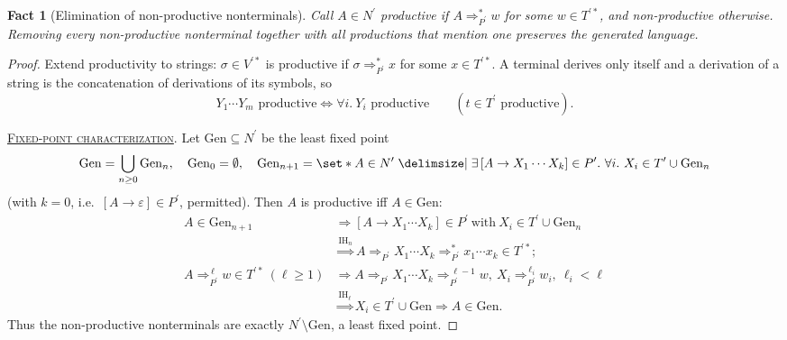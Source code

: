 \documentclass[11pt,a4paper]{article}
\theoremstyle{prettyplain}
\newtheorem{fact}[theorem]{Fact}
\theoremstyle{prettydef}
\def\mid{\;\delimsize\vert\;}#1%
\newcommand{\eps}{\varepsilon}
\newcommand{\Item}[2]{[#1\to #2]}
\newcommand{\proofpart}[1]{\par\medskip\noindent\uline{\textsc{#1}}.}
\begin{document}
\begin{fact}[Elimination of non-productive nonterminals]\label{fact:productive}
Call \(A\in N^\prime\) \emph{productive} if \(A\Rightarrow_{P^\prime}^*w\) for some
\(w\in T^{\prime *}\), and \emph{non-productive} otherwise.  Removing every
non-productive nonterminal together with all productions that mention one
preserves the generated language.
\end{fact}

\begin{proof}
Extend productivity to strings: \(\sigma\in V^{\prime *}\) is productive if
\(\sigma\Rightarrow_{P^\prime}^*x\) for some \(x\in T^{\prime *}\).  A terminal
derives only itself and a derivation of a string is the concatenation of
derivations of its symbols, so
\begin{equation}\label{eq:prod-string}
Y_1\cdots Y_m\text{ productive}
\iff
\forall i.\ Y_i\text{ productive}
\qquad(t\in T^\prime\text{ productive}).
\end{equation}

\proofpart{Fixed-point characterization}
Let \(\mathrm{Gen}\subseteq N^\prime\) be the least fixed point
\[
\mathrm{Gen}=\bigcup_{n\ge 0}\mathrm{Gen}_n,
\quad
\mathrm{Gen}_0=\emptyset,
\quad
\mathrm{Gen}_{n+1}
=\set*{A\in N^\prime\mid
\exists\,\Item{A}{X_1\cdots X_k}\in P^\prime.\
\forall i.\ X_i\in T^\prime\cup\mathrm{Gen}_n}
\]
(with \(k=0\), i.e.\ \(\Item{A}{\eps}\in P^\prime\), permitted).  Then \(A\) is
productive iff \(A\in\mathrm{Gen}\):
\[
\begin{aligned}
A\in\mathrm{Gen}_{n+1}
&\Longrightarrow
\Item{A}{X_1\cdots X_k}\in P^\prime\ \text{with}\ X_i\in T^\prime\cup\mathrm{Gen}_n\\
&\overset{\mathrm{IH}_n}{\Longrightarrow}
A\Rightarrow_{P^\prime}X_1\cdots X_k\Rightarrow_{P^\prime}^*x_1\cdots x_k\in T^{\prime *};\\[2pt]
A\Rightarrow_{P^\prime}^{\,\ell}w\in T^{\prime *}\ (\ell\ge1)
&\Longrightarrow
A\Rightarrow_{P^\prime}X_1\cdots X_k\Rightarrow_{P^\prime}^{\,\ell-1}w,\
X_i\Rightarrow_{P^\prime}^{\,\ell_i}w_i,\ \ell_i<\ell\\
&\overset{\mathrm{IH}_\ell}{\Longrightarrow}
X_i\in T^\prime\cup\mathrm{Gen}\Longrightarrow A\in\mathrm{Gen}.
\end{aligned}
\]
Thus the non-productive nonterminals are exactly \(N^\prime\setminus\mathrm{Gen}\),
a least fixed point.


\end{proof}
\end{document}
